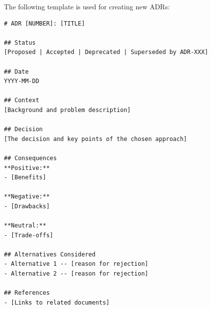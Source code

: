 The following template is used for creating new ADRs:

\begin{verbatim}
# ADR [NUMBER]: [TITLE]

## Status
[Proposed | Accepted | Deprecated | Superseded by ADR-XXX]

## Date
YYYY-MM-DD

## Context
[Background and problem description]

## Decision
[The decision and key points of the chosen approach]

## Consequences
**Positive:**
- [Benefits]

**Negative:**
- [Drawbacks]

**Neutral:**
- [Trade-offs]

## Alternatives Considered
- Alternative 1 -- [reason for rejection]
- Alternative 2 -- [reason for rejection]

## References
- [Links to related documents]
\end{verbatim}

